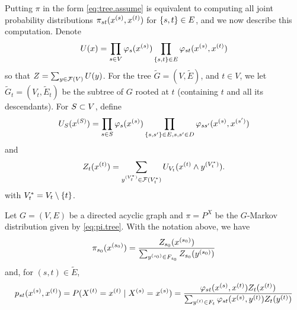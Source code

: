 Putting $\pi$ in the form \cref{eq:tree.assume} is equivalent to computing  all joint probability distributions
$\pi_{st}(x^{(s)}, x^{(t)})$ for $\left\{ s,t \right\}\in E$, and we now describe this computation. Denote
$$
U(x)  = \prod_{s\in V} \varphi_s(x^{(s)}) \prod_{\left\{ s,t \right\}\in E}
\varphi_{st}(x^{(s)}, x^{(t)})
$$
so that $Z=\sum_{y\in {\mathcal F}(V)} U(y)$. For the tree $\tilde G = (V, \tilde E)$, and $t\in V$,
we let $\tilde G_t = (V_t, \tilde E_t)$ be the subtree of $G$ rooted at $t$ (containing $t$ and all its descendants). For
$S\subset V$,  define 
$$
U_S(x^{(S)}) = \prod_{s\in S} \varphi_s(x^{(s)}) \prod_{\left\{ s,s' \right\}\in E,
s,s'\in D}
\varphi_{ss'}(x^{(s)}, x^{(s')})
$$
and
$$
Z_t(x^{(t)}) = \sum_{y^{(V^*_t)}\in {\mathcal F}(V^*_t)} U_{V_t}(x^{(t)}\wedge y^{(V^*_t)}).
$$
with $V_t^* = V_t\setminus \{t\}$.

\begin{lemma}
\label{lem:acyc.tree}
Let $G = (V, E)$ be a directed acyclic graph and $\pi = P^X$ be the $G$-Markov
distribution given by \cref{eq:pi.tree}. With the notation above, we
have
\begin{equation}
\label{eq:acyc.tree.1}
\pi_{s_0}(x^{(s_0)}) =\frac{Z_{s_0}(x^{(s_0)})}{\sum_{y^{(s_0)}\in F_{s_0} }
Z_{s_0} (y^{(s_0)})}
\end{equation}
and, for $(s,t)\in \tilde E$,
\begin{equation}
\label{eq:acyc.tree.2}
p_{st}(x^{(s)}, x^{(t)}) = P(X^{(t)}=x^{(t)}\mid X^{(s)}=x^{(s)})  = \frac{\varphi_{st}(x^{(s)}, x^{(t)})
Z_t(x^{(t)})}{\sum_{y^{(t)}\in F_t} \varphi_{st}(x^{(s)}, y^{(t)}) Z_t(y^{(t)})}
\end{equation}
\end{lemma}
